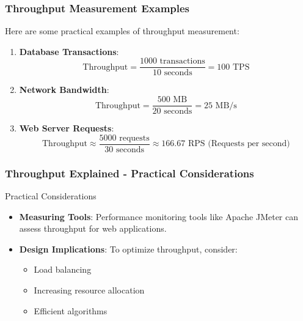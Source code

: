 \documentclass[aspectratio=169]{beamer}
\begin{document}
\begin{frame}[fragile]
    \frametitle{Throughput Measurement Examples}
    Here are some practical examples of throughput measurement:
    \begin{enumerate}
        \item \textbf{Database Transactions}:
            \begin{equation}
            \text{Throughput} = \frac{1000 \text{ transactions}}{10 \text{ seconds}} = 100 \text{ TPS}
            \end{equation}
        
        \item \textbf{Network Bandwidth}:
            \begin{equation}
            \text{Throughput} = \frac{500 \text{ MB}}{20 \text{ seconds}} = 25 \text{ MB/s}
            \end{equation}
        
        \item \textbf{Web Server Requests}:
            \begin{equation}
            \text{Throughput} \approx \frac{5000 \text{ requests}}{30 \text{ seconds}} \approx 166.67 \text{ RPS (Requests per second)}
            \end{equation}
    \end{enumerate}
\end{frame}

\begin{frame}[fragile]
    \frametitle{Throughput Explained - Practical Considerations}
    \begin{block}{Practical Considerations}
        \begin{itemize}
            \item \textbf{Measuring Tools}: Performance monitoring tools like Apache JMeter can assess throughput for web applications.
            \item \textbf{Design Implications}: To optimize throughput, consider:
                \begin{itemize}
                    \item Load balancing
                    \item Increasing resource allocation
                    \item Efficient algorithms
                \end{itemize}
        \end{itemize}
    \end{block}
\end{frame}
\end{document}
